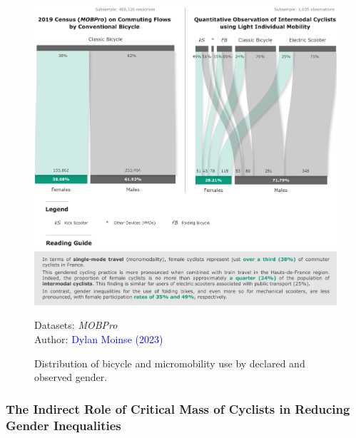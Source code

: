 \begin{refsegment}
\begin{figure}[h!]\vspace*{4pt}
    \caption{Distribution of bicycle and micromobility use by declared and observed gender.}
    \label{fig-chap4:part-modale-genree-mobilite-individuelle-legere}
    \centerline{\includegraphics[width=1\columnwidth]{src/Figures/Chap-4/EN_Part_modale_genre_OLS.pdf}}
    \vspace{5pt}
    \begin{flushright}\scriptsize{
    Datasets: \textsl{MOBPro} \textcolor{blue}{\autocite{insee_documentation_2023}}
    \\
    Author: \textcolor{blue}{Dylan Moinse (2023)}
    }\end{flushright}
\end{figure}

\subsubsection*{The Indirect Role of Critical Mass of Cyclists in Reducing Gender Inequalities
    \label{chap4:masse-critique-genre}
    }


\end{refsegment}
